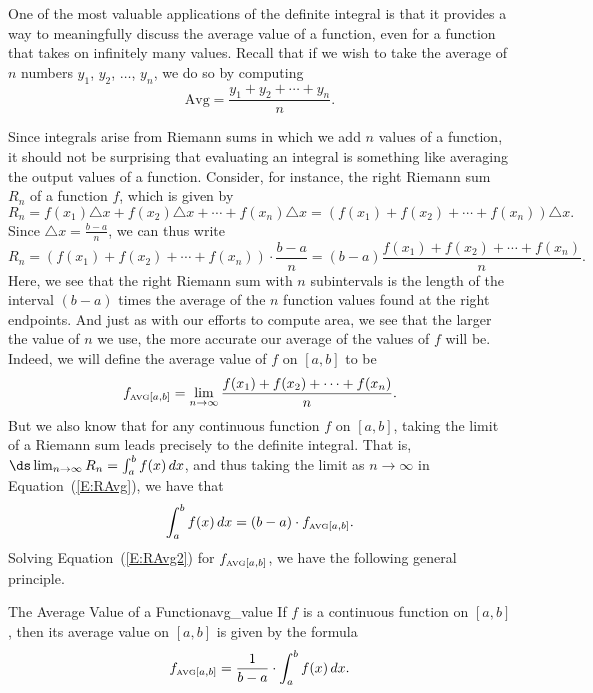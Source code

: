 One of the most valuable applications of the definite integral is that it provides a way to meaningfully discuss the average value of a function, even for a function that takes on infinitely many values.  Recall that if we wish to take the average of $n$ numbers $y_1$, $y_2$, $\ldots$, $y_n$, we do so by computing
$$\mbox{Avg} = \frac{y_1 + y_2 + \cdots + y_n}{n}.$$

Since integrals arise from Riemann sums in which we add $n$ values of a function, it should not be surprising that evaluating an integral is something like averaging the output values of a function.  Consider, for instance, the right Riemann sum $R_n$ of a function $f$, which is given by
$$R_n = f(x_1) \triangle x + f(x_2) \triangle x + \cdots + f(x_n) \triangle x = (f(x_1) + f(x_2) + \cdots + f(x_n))\triangle x.$$
Since $\triangle x = \frac{b-a}{n}$, we can thus write 
\begin{equation} \label{E:RAvg}
R_n = (f(x_1) + f(x_2) + \cdots + f(x_n))\cdot \frac{b-a}{n} = (b-a) \frac{f(x_1) + f(x_2) + \cdots + f(x_n)}{n}.
\end{equation}
Here, we see that the right Riemann sum with $n$ subintervals is the length of the interval $(b-a)$ times the average of the $n$ function values found at the right endpoints.  And just as with our efforts to compute area, we see that the larger the value of $n$ we use, the more accurate our average of the values of $f$ will be.  Indeed, we will define the average value of $f$ on $[a,b]$ to be 
$$f_{\mbox{\tiny{AVG}}[a,b]} = \lim_{n \to \infty} \frac{f(x_1) + f(x_2) + \cdots + f(x_n)}{n}.$$  But we also know that for any continuous function $f$ on $[a,b]$, taking the limit of a Riemann sum leads precisely to the definite integral.  That is, $\ds \lim_{n \to \infty} R_n = \int_a^b f(x) \, dx$, and thus taking the limit as $n \to \infty$ in Equation~(\ref{E:RAvg}), we have that
\begin{equation} \label{E:RAvg2}
\int_a^b f(x) \, dx = (b-a) \cdot f_{\mbox{\tiny{AVG}}[a,b]}.
\end{equation}
Solving Equation~(\ref{E:RAvg2}) for $f_{\mbox{\tiny{AVG}}[a,b]}$, we have the following general principle.

\begin{definition}{The Average Value of a Function}{avg_value}
If $f$ is a continuous function on $[a,b]$, then its average value on $[a,b]$ is given by the formula
$$f_{\mbox{\tiny{AVG}}[a,b]} = \frac{1}{b-a} \cdot \int_a^b f(x) \, dx.$$
\end{definition}

